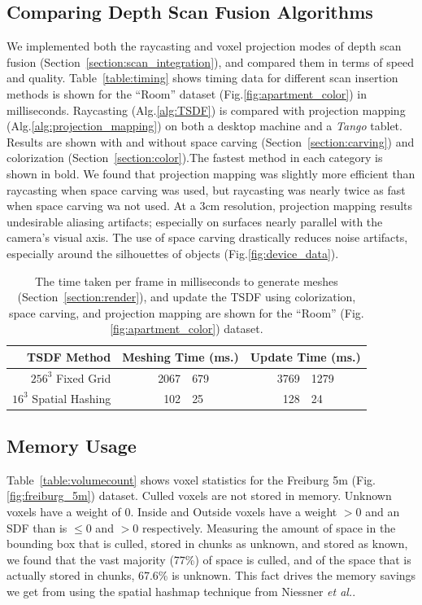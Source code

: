 \documentclass[conference]{IEEEtran}
\newcommand{\sref}[1]{Section~\ref{#1}}
\newcommand{\figref}[1]{Fig.\ref{#1}}
\newcommand{\tabref}[1]{Table~\ref{#1}}
\newcommand{\algoref}[1]{Alg.\ref{#1}}
\newcommand{\etal}{\textit{et al.}\xspace}
\newcommand{\Tango}{\textit{Tango}\xspace}
\newcommand{\TSDF}{TSDF\xspace}
\begin{document}
\subsection{Comparing Depth Scan Fusion Algorithms} 
\label{section:scan_compare}
We implemented both the raycasting and voxel projection modes of depth scan
fusion (\sref{section:scan_integration}), and compared them in terms of speed
and quality. \tabref{table:timing} shows timing data for different scan
insertion methods is shown for the ``Room'' dataset
(\figref{fig:apartment_color}) in milliseconds.  Raycasting (\algoref{alg:TSDF})
is compared with projection mapping (\algoref{alg:projection_mapping}) on both a
desktop machine and a \Tango tablet. Results are shown with and without
space carving (\sref{section:carving}) and colorization
(\sref{section:color}).The fastest method in each category is shown in bold. We
found that projection mapping was slightly more efficient than raycasting when
space carving was used, but raycasting was nearly twice as fast when space
carving wa not used. At a 3cm resolution, projection mapping results undesirable
aliasing artifacts; especially on surfaces nearly parallel with the camera's
visual axis. The use of space carving drastically reduces noise artifacts,
especially around the silhouettes of objects (\figref{fig:device_data}).

\begin{table}
\centering
\begin{tabular} {rr@{ $\pm$ }lr@{ $\pm$ }l} \toprule
\TSDF Method & \multicolumn{2}{c}{Meshing Time (ms.)} & \multicolumn{2}{c}{Update Time (ms.)}\\ 
\midrule
$256^3$ Fixed Grid     & 2067 & 679 & 3769 & 1279  \\
$16^3$ Spatial Hashing & 102  &  25 & 128 &   24   \\ 
\bottomrule
\end{tabular}
\caption{The time taken per frame in milliseconds to generate meshes
(\sref{section:render}), and update the \TSDF using colorization, space carving, and projection mapping
are shown for the ``Room'' (\figref{fig:apartment_color}) dataset.}
\label{table:meshingtimes}
\end{table}

\subsection{Memory Usage}
\label{section:memory}

\tabref{table:volumecount} shows voxel statistics for the Freiburg 5m
(\figref{fig:freiburg_5m}) dataset. Culled voxels are not stored in  memory.
Unknown voxels have a weight of 0. Inside and Outside voxels have a weight $>
0$ and an SDF than is $\leq 0$ and $> 0$ respectively. Measuring the amount of
space in the bounding box that is culled, stored in chunks as unknown, and
stored as known, we found that the vast majority (77\%) of space is culled, and
of the space that is actually stored in chunks, 67.6\% is unknown. This fact
drives the memory savings we get from using the spatial hashmap
technique from Niessner \etal \cite{NiessnerHashing}.
\end{document}
